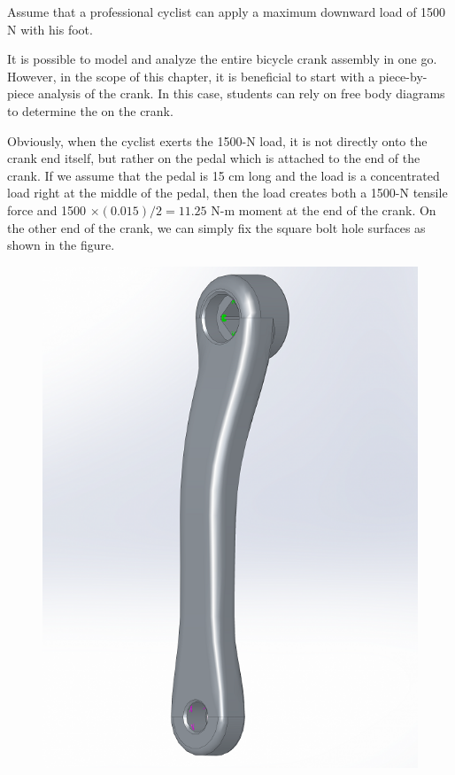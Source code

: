 \documentclass[
10pt,
a4paper,
openany,
svgnames,
]{book}
\begin{document}
\begin{solution}
Assume that a professional cyclist can apply a maximum downward load of 1500 N with his foot. 

It is possible to model and analyze the entire bicycle crank assembly in one go. However, in the scope of this chapter, it is beneficial to start with a piece-by-piece analysis of the crank. In this case, students can rely on free body diagrams to determine the on the crank.

Obviously, when the cyclist exerts the 1500-N load, it is not directly onto the crank end itself, but rather on the pedal which is attached to the end of the crank. If we assume that the pedal is 15 cm long and the load is a concentrated load right at the middle of the pedal, then the load creates both a 1500-N tensile force and 1500 $\times (0.015)/2 = 11.25$ N-m moment at the end of the crank. On the other end of the crank, we can simply fix the square bolt hole surfaces as shown in the figure. 

\begin{figure}[H]
  \centering
  \includegraphics[scale=0.4]{pictures/Intro-CAD/Crank-before-running}
\end{figure}
  

\end{solution}
\end{document}
